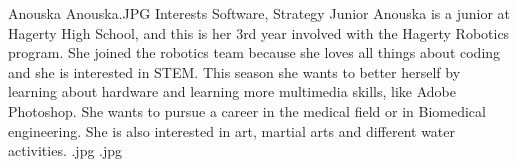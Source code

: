 \insertbio
{Anouska}
{Anouska.JPG}
{Interests}
{Software, Strategy}
{Junior}
{
Anouska is a junior at Hagerty High School, and this is her 3rd year involved with the Hagerty Robotics program. She joined the robotics team because she loves all things about coding and she is interested in STEM. This season she wants to better herself by learning about hardware and learning more multimedia skills, like Adobe Photoshop. She wants to pursue a career in the medical field or in Biomedical engineering. She is also interested in art, martial arts and different water activities. 
}
{.jpg}
{.jpg}
